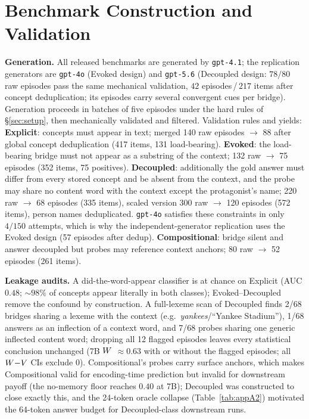 \section{Benchmark Construction and Validation}
\label{app:benchmarks}

\textbf{Generation.} All released benchmarks are generated by
\texttt{gpt-4.1}; the replication generators are \texttt{gpt-4o} (Evoked
design) and \texttt{gpt-5.6} (Decoupled design: $78/80$ raw episodes pass the
same mechanical validation, $42$ episodes\,/\,$217$ items after concept
deduplication; its episodes carry several convergent cues per bridge).
Generation proceeds in batches of five
episodes under the hard rules of \S\ref{sec:setup}, then mechanically validated
and filtered. Validation rules and yields:
\textbf{Explicit}: concepts must appear in text; merged 140 raw episodes
$\to$ 88 after global concept deduplication (417 items, 131 load-bearing).
\textbf{Evoked}: the load-bearing bridge must not appear as a substring of the
context; 132 raw $\to$ 75 episodes (352 items, 75 positives).
\textbf{Decoupled}: additionally the gold answer must differ from
every stored concept and be absent from the context, and the probe may share no
content word with the context except the protagonist's name; 220 raw $\to$ 68
episodes (335 items), scaled version 300 raw $\to$ 120 episodes (572 items),
person names deduplicated. \texttt{gpt-4o} satisfies these constraints in only
$4/150$ attempts, which is why the independent-generator replication uses the
Evoked design (57 episodes after dedup).
\textbf{Compositional}: bridge silent and answer decoupled but probes may
reference context anchors; 80 raw $\to$ 52 episodes (261 items).

\textbf{Leakage audits.} A did-the-word-appear classifier is at chance on Explicit
(AUC $0.48$; ${\sim}98\%$ of concepts appear literally in both classes); Evoked--Decoupled
remove the confound by construction. A full-lexeme scan of Decoupled finds 2/68 bridges
sharing a lexeme with the context (e.g.\ \emph{yankees}/``Yankee Stadium''),
1/68 answers as an inflection of a context word, and 7/68 probes sharing one
generic inflected content word; dropping all 12 flagged episodes leaves every
statistical conclusion unchanged (7B $W$ ${\approx}0.63$ with or without
the flagged episodes; all $W{-}V$ CIs exclude 0). Compositional's probes carry surface anchors, which makes Compositional
valid for encoding-time prediction but invalid for downstream payoff
(the no-memory floor reaches $0.40$ at 7B); Decoupled was constructed to close exactly
this, and the 24-token oracle collapse (Table~\ref{tab:appA2}) motivated the
64-token answer budget for Decoupled-class downstream runs.


